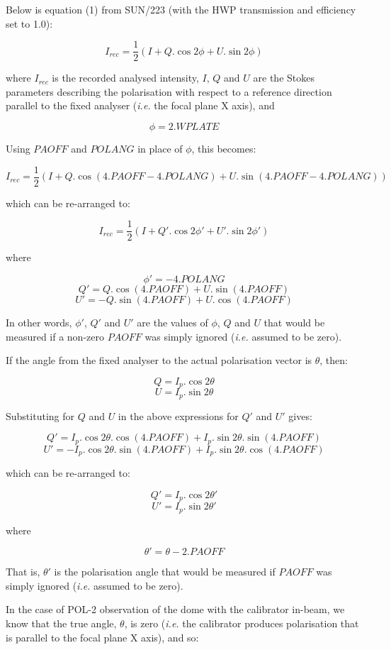 \documentclass[twoside,11pt]{starlink}
\begin{document}
Below is equation (1) from SUN/223
 (with the
HWP transmission and efficiency set to 1.0):

\[ I_{rec} = \frac{1}{2}( I + Q.\cos 2\phi + U.\sin 2\phi ) \]

where $I_{rec}$ is the recorded analysed intensity, $I$, $Q$ and $U$ are
the Stokes parameters describing the polarisation with respect to a
reference direction parallel to the fixed analyser (\emph{i.e.} the focal
plane X axis), and

\[ \phi = 2.WPLATE \]

Using $PAOFF$ and $POLANG$ in place of $\phi$, this becomes:

\[ I_{rec} = \frac{1}{2}( I + Q.\cos(4.PAOFF - 4.POLANG) + U.\sin(4.PAOFF - 4.POLANG) ) \]

which can be re-arranged to:

\[ I_{rec} = \frac{1}{2}( I + Q'.\cos 2\phi' + U'.\sin 2\phi' ) \]

where

\[ \phi' = -4.POLANG \]
\[ Q' = Q.\cos( 4.PAOFF ) + U.\sin( 4.PAOFF )\]
\[ U' = -Q.\sin( 4.PAOFF ) + U.\cos( 4.PAOFF )\]

In other words, $\phi'$, $Q'$ and $U'$ are the values of $\phi$, $Q$
and $U$ that would be measured if a non-zero $PAOFF$ was simply ignored
(\emph{i.e.} assumed to be zero).

If the angle from the fixed analyser to the actual polarisation vector is
$\theta$, then:

\[ Q = I_p.\cos 2\theta \]
\[ U = I_p.\sin 2\theta \]

Substituting for $Q$ and $U$ in the above expressions for $Q'$ and $U'$
gives:

\[ Q' = I_p.\cos 2\theta.\cos( 4.PAOFF ) + I_p.\sin 2\theta.\sin( 4.PAOFF )\]
\[ U' = -I_p.\cos 2\theta.\sin( 4.PAOFF ) + I_p.\sin 2\theta.\cos( 4.PAOFF )\]

which can be re-arranged to:

\[ Q' = I_p.\cos 2\theta' \]
\[ U' = I_p.\sin 2\theta' \]

where

\[ \theta' = \theta - 2.PAOFF \]

That is, $\theta'$ is the polarisation angle that would be measured if
$PAOFF$ was simply ignored (\emph{i.e.} assumed to be zero).

In the case of POL-2 observation of the dome with the calibrator in-beam,
we know that the true angle, $\theta$, is zero (\emph{i.e.} the calibrator
produces polarisation that is parallel to the focal plane X axis), and so:
\end{document}
